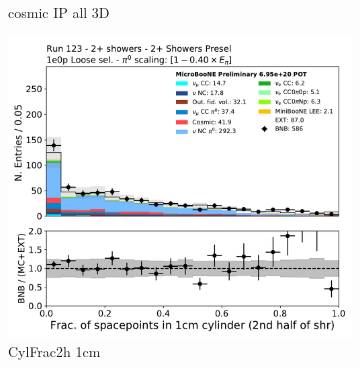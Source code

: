 \begin{figure}[H]
\begin{subfigure}{0.3\textwidth}
    \caption{cosmic IP all 3D}
    \end{subfigure}
    \begin{subfigure}{0.3\textwidth}
    \includegraphics[width=1.0\textwidth]{Sidebands/Figures/TwoShr_1e0pSel/loose/CylFrac2h_1cm.pdf}
    \caption{CylFrac2h 1cm}
    \end{subfigure}
    \caption{} 
    \label{fig:HE_1eNp_1}
\end{figure}

